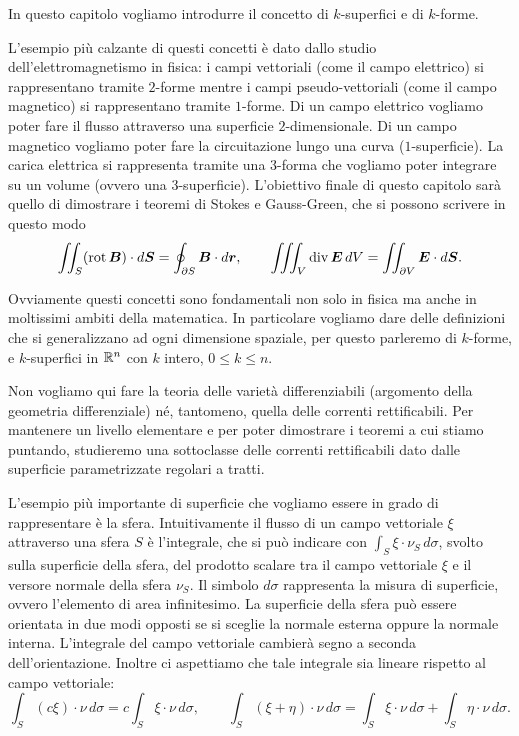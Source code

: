In questo capitolo vogliamo introdurre il concetto di $k$-superfici e di $k$-forme.

L'esempio più calzante di questi concetti è dato dallo studio dell'elettromagnetismo 
in fisica: i campi vettoriali (come il campo elettrico) si rappresentano tramite $2$-forme 
mentre i campi pseudo-vettoriali (come il campo magnetico) si rappresentano tramite $1$-forme.
Di un campo elettrico vogliamo poter fare il flusso attraverso una superficie $2$-dimensionale.
Di un campo magnetico vogliamo poter fare la circuitazione lungo una curva ($1$-superficie).
La carica elettrica si rappresenta tramite una $3$-forma che vogliamo 
poter integrare su un volume (ovvero una $3$-superficie).
L'obiettivo finale di questo capitolo sarà quello di dimostrare i teoremi di Stokes 
e Gauss-Green, che si possono scrivere in questo modo
\[
  \iint_S (\operatorname{rot} \boldsymbol B)\cdot d\boldsymbol S 
  = \oint_{\partial S} \boldsymbol B \cdot d\boldsymbol r, \qquad 
  \iiint_V \operatorname{div} \boldsymbol E\, dV 
  = \iint_{\partial V} \boldsymbol E\cdot d\boldsymbol S.
\]

Ovviamente questi concetti sono fondamentali non solo in fisica ma anche in moltissimi
ambiti della matematica. 
In particolare vogliamo dare delle definizioni 
che si generalizzano ad ogni dimensione spaziale, per questo parleremo di $k$-forme,
e $k$-superfici in ${\mathbb R}^n$ con $k$ intero, $0\le k \le n$.

Non vogliamo qui fare la teoria delle varietà differenziabili 
(argomento della geometria differenziale) né, tantomeno, 
quella delle correnti rettificabili. 
Per mantenere un livello elementare e per poter dimostrare i teoremi a cui 
stiamo puntando, studieremo una sottoclasse delle correnti rettificabili dato 
dalle superficie parametrizzate regolari a tratti.

L'esempio più importante di superficie che vogliamo essere in grado di rappresentare 
è la sfera. 
Intuitivamente il flusso di un campo vettoriale $\xi$ attraverso una sfera $S$ è l'integrale,
che si può indicare con $\int_S \xi\cdot \nu_S\, d\sigma$,
svolto sulla superficie della sfera, del prodotto scalare tra il campo vettoriale $\xi$
e il versore normale della sfera $\nu_S$.
Il simbolo $d\sigma$ rappresenta la misura di superficie, ovvero l'elemento di area infinitesimo.
La superficie della sfera può essere orientata in due modi opposti se si sceglie 
la normale esterna oppure la normale interna. 
L'integrale del campo vettoriale cambierà segno a seconda dell'orientazione.
Inoltre ci aspettiamo che tale integrale sia lineare rispetto al campo vettoriale:
\[
\int_S (c \xi) \cdot \nu\, d\sigma = c \int_S \xi \cdot \nu\, d\sigma,
\qquad
\int_S (\xi+\eta)\cdot \nu \, d\sigma = \int_S \xi\cdot \nu \, d\sigma + \int_S \eta\cdot\nu\, d\sigma.
\]


